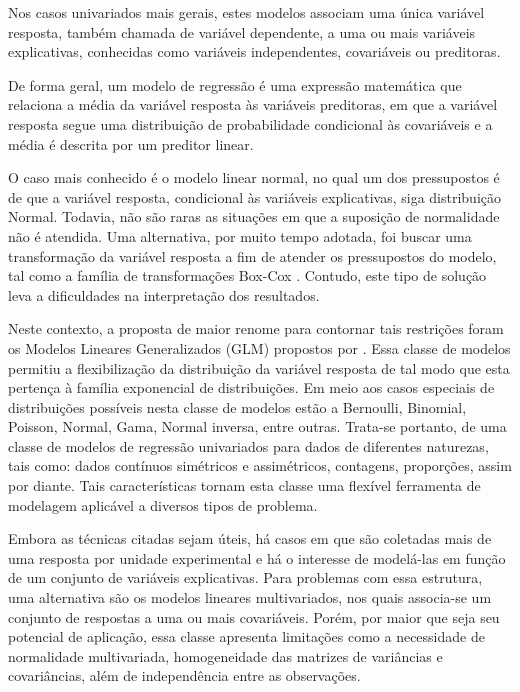Nos casos univariados mais gerais, estes modelos associam uma única variável resposta, também chamada de variável dependente, a uma ou mais variáveis explicativas, conhecidas como variáveis independentes, covariáveis ou preditoras. 

De forma geral, um modelo de regressão é uma expressão matemática que relaciona a média da variável resposta às variáveis preditoras, em que a variável resposta segue uma distribuição de probabilidade condicional às covariáveis e a média é descrita por um preditor linear. 

O caso mais conhecido é o modelo linear normal, no qual um dos pressupostos é de que a variável resposta, condicional às variáveis explicativas, siga distribuição Normal. Todavia, não são raras as situações em que a suposição de normalidade não é atendida. Uma alternativa, por muito tempo adotada, foi buscar uma transformação da variável resposta a fim de atender os pressupostos do modelo, tal como a família de transformações Box-Cox \citep{boxcox64}. Contudo, este tipo de solução leva a dificuldades na interpretação dos resultados.

Neste contexto, a proposta de maior renome para contornar tais restrições foram os Modelos Lineares Generalizados (GLM) propostos por \citet{Nelder72}. Essa classe de modelos permitiu a flexibilização da distribuição da variável resposta de tal modo que esta pertença à família exponencial de distribuições. Em meio aos casos especiais de distribuições possíveis nesta classe de modelos estão a Bernoulli, Binomial, Poisson, Normal, Gama, Normal inversa, entre outras. Trata-se portanto, de uma classe de modelos de regressão univariados para dados de diferentes naturezas, tais como: dados contínuos simétricos e assimétricos, contagens, proporções, assim por diante. Tais características tornam esta classe uma flexível ferramenta de modelagem aplicável a diversos tipos de problema.

Embora as técnicas citadas sejam úteis, há casos em que são coletadas mais de uma resposta por unidade experimental e há o interesse de modelá-las em função de um conjunto de variáveis explicativas. Para problemas com essa estrutura, uma alternativa são os modelos lineares multivariados, nos quais associa-se um conjunto de respostas a uma ou mais covariáveis. Porém, por maior que seja seu potencial de aplicação, essa classe apresenta limitações como a necessidade de normalidade multivariada, homogeneidade das matrizes de variâncias e covariâncias, além de independência entre as observações.

